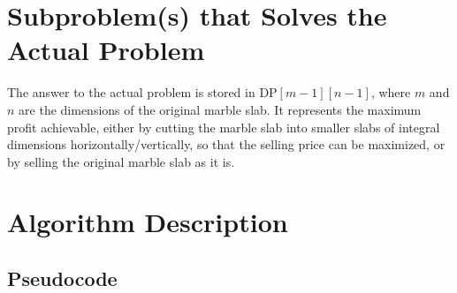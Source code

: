 \documentclass{article}
\begin{document}
\section{Subproblem(s) that Solves the Actual Problem}

The answer to the actual problem is stored in $\text{DP}[m - 1][n - 1]$, where $m$ and $n$ are the dimensions of the original marble slab. It represents the maximum profit achievable, either by cutting the marble slab into smaller slabs of integral dimensions horizontally/vertically, so that the selling price can be maximized, or by selling the original marble slab as it is.

\newpage

\section{Algorithm Description}
\subsection{Pseudocode}
\end{document}
